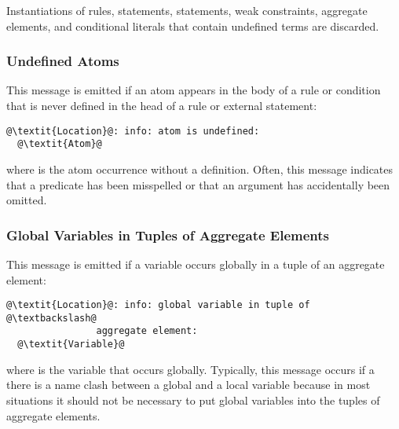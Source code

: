\begin{note}
Instantiations of rules,  statements,  statements, weak constraints, aggregate elements, and conditional literals
that contain undefined terms are discarded.
\end{note}

\subsubsection{Undefined Atoms}\label{sec:warn:undefatm}
This message is emitted if an atom appears in the body of a rule or condition
that is never defined in the head of a rule or external statement:
\begin{lstlisting}[numbers=none,escapechar=@]
@\textit{Location}@: info: atom is undefined:
  @\textit{Atom}@
\end{lstlisting}
%
where  is the atom occurrence without a definition.
Often, this message indicates that a predicate has been misspelled 
or that an argument has accidentally been omitted.

\subsubsection{Global Variables in Tuples of Aggregate Elements}\label{sec:warn:global}
This message is emitted if a variable occurs globally in a tuple of an aggregate element:
\begin{lstlisting}[numbers=none,escapechar=@]
@\textit{Location}@: info: global variable in tuple of @\textbackslash@
                aggregate element:
  @\textit{Variable}@
\end{lstlisting}
where  is the variable that occurs globally.
Typically, this message occurs if a there is a name clash between a global and a local variable
because in most situations it should not be necessary to put global variables into the tuples of aggregate elements.

